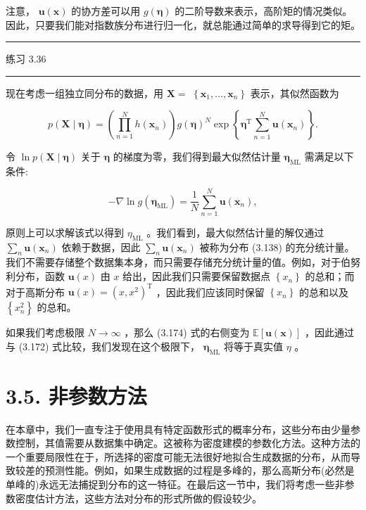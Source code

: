 \documentclass[10pt]{article}
\newcommand{\HRule}{\begin{center}\rule{0.9\linewidth}{0.2mm}\end{center}}
\begin{document}
注意， \(\mathbf{u}\left( \mathbf{x}\right)\) 的协方差可以用 \(g\left( \mathbf{\eta }\right)\) 的二阶导数来表示，高阶矩的情况类似。因此，只要我们能对指数族分布进行归一化，就总能通过简单的求导得到它的矩。

\HRule

练习 3.36

\HRule

现在考虑一组独立同分布的数据，用 \(\mathbf{X} =\)  \(\left\{  {{\mathbf{x}}_{1},\ldots ,{\mathbf{x}}_{n}}\right\}\) 表示，其似然函数为

\[
p\left( {\mathbf{X} \mid  \mathbf{\eta }}\right)  = \left( {\mathop{\prod }\limits_{{n = 1}}^{N}h\left( {\mathbf{x}}_{n}\right) }\right) g{\left( \mathbf{\eta }\right) }^{N}\exp \left\{  {{\mathbf{\eta }}^{\mathrm{T}}\mathop{\sum }\limits_{{n = 1}}^{N}\mathbf{u}\left( {\mathbf{x}}_{n}\right) }\right\}  . \tag{3.173}
\]

令 \(\ln p\left( {\mathbf{X} \mid  \mathbf{\eta }}\right)\) 关于 \(\mathbf{\eta }\) 的梯度为零，我们得到最大似然估计量 \({\mathbf{\eta }}_{\mathrm{{ML}}}\) 需满足以下条件:

\[
- \nabla \ln g\left( {\mathbf{\eta }}_{\mathrm{{ML}}}\right)  = \frac{1}{N}\mathop{\sum }\limits_{{n = 1}}^{N}\mathbf{u}\left( {\mathbf{x}}_{n}\right) , \tag{3.174}
\]

原则上可以求解该式以得到 \({\eta }_{\mathrm{{ML}}}\) 。我们看到，最大似然估计量的解仅通过 \(\mathop{\sum }\limits_{n}\mathbf{u}\left( {\mathbf{x}}_{n}\right)\) 依赖于数据，因此 \(\mathop{\sum }\limits_{n}\mathbf{u}\left( {\mathbf{x}}_{n}\right)\) 被称为分布 (3.138) 的充分统计量。我们不需要存储整个数据集本身，而只需要存储充分统计量的值。例如，对于伯努利分布，函数 \(\mathbf{u}\left( x\right)\) 由 \(x\) 给出，因此我们只需要保留数据点 \(\left\{  {x}_{n}\right\}\) 的总和；而对于高斯分布 \(\mathbf{u}\left( x\right)  = {\left( x,{x}^{2}\right) }^{\mathrm{T}}\) ，因此我们应该同时保留 \(\left\{  {x}_{n}\right\}\) 的总和以及 \(\left\{  {x}_{n}^{2}\right\}\) 的总和。

如果我们考虑极限 \(N \rightarrow  \infty\) ，那么 (3.174) 式的右侧变为 \(\mathbb{E}\left\lbrack  {\mathbf{u}\left( \mathbf{x}\right) }\right\rbrack\) ，因此通过与 (3.172) 式比较，我们发现在这个极限下， \({\mathbf{\eta }}_{\mathrm{{ML}}}\) 将等于真实值 \(\eta\) 。

\section*{3.5. 非参数方法}

在本章中，我们一直专注于使用具有特定函数形式的概率分布，这些分布由少量参数控制，其值需要从数据集中确定。这被称为密度建模的参数化方法。这种方法的一个重要局限性在于，所选择的密度可能无法很好地拟合生成数据的分布，从而导致较差的预测性能。例如，如果生成数据的过程是多峰的，那么高斯分布(必然是单峰的)永远无法捕捉到分布的这一特征。在最后这一节中，我们将考虑一些非参数密度估计方法，这些方法对分布的形式所做的假设较少。
\end{document}
